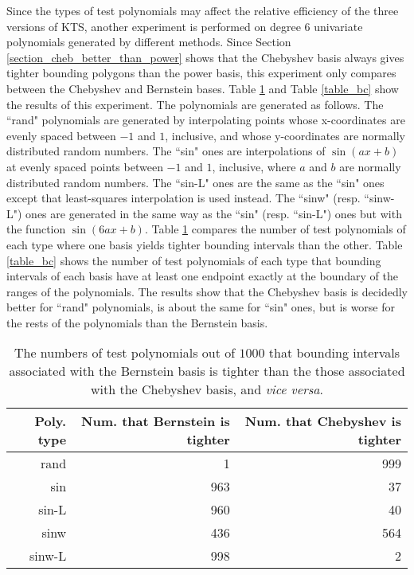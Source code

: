 \documentclass[12pt]{article}
\begin{document}
Since the types of test polynomials may affect the relative
efficiency of the three versions of KTS, another experiment is
performed on degree $6$ univariate polynomials generated by
different methods.  Since Section
\ref{section_cheb_better_than_power} shows that the Chebyshev
basis always gives tighter bounding polygons than the power basis,
this experiment only compares between the Chebyshev and Bernstein
bases.  Table \ref{table_bb} and Table \ref{table_bc} show the
results of this experiment.  The polynomials are generated as
follows. The ``rand" polynomials are generated by interpolating
points whose x-coordinates are evenly spaced between $-1$ and $1$,
inclusive, and whose y-coordinates are normally distributed random
numbers. The ``sin" ones are interpolations of $\sin(ax+b)$ at
evenly spaced points between $-1$ and $1$, inclusive, where $a$
and $b$ are normally distributed random numbers.  The ``sin-L"
ones are the same as the ``sin" ones except that least-squares
interpolation is used instead. The ``sinw" (resp. ``sinw-L") ones
are generated in the same way as the ``sin" (resp. ``sin-L") ones
but with the function $\sin(6ax+b)$. Table \ref{table_bb} compares
the number of test polynomials of each type where one basis yields
tighter bounding intervals than the other.  Table \ref{table_bc}
shows the number of test polynomials of each type that bounding
intervals of each basis have at least one endpoint exactly at the
boundary of the ranges of the polynomials. The results show that
the Chebyshev basis is decidedly better for ``rand" polynomials,
is about the same for ``sin" ones, but is worse for the rests of
the polynomials than the Bernstein basis.
\begin{table}
\caption{The numbers of test polynomials out of $1000$ that
bounding intervals associated with the Bernstein basis is tighter
than the those associated with the Chebyshev basis, and \emph{vice
versa}. \label{table_bb} } \begin{center}
\begin{tabular}{|r|r|r|}
\hline Poly. type & Num. that Bernstein is tighter & Num. that Chebyshev is tighter\\
\hline \hline
rand & 1 & 999 \\
sin & 963 & 37 \\
sin-L & 960 & 40 \\
sinw & 436 & 564 \\
sinw-L & 998 & 2 \\
\hline
\end{tabular}
\end{center}
\end{table}
\end{document}
